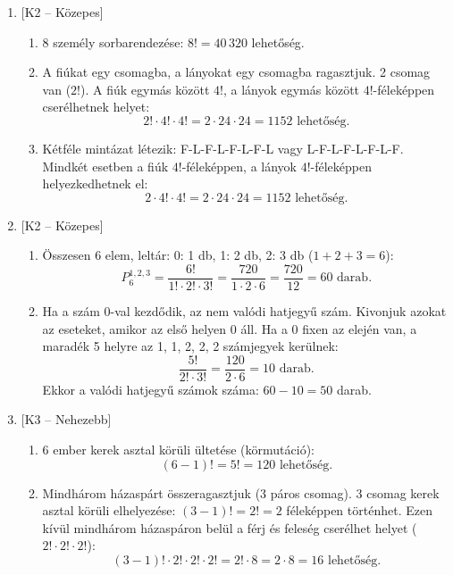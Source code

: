 \documentclass[12pt,a4paper]{article}
\begin{document}
\begin{enumerate}[label=\arabic*., leftmargin=*]
    \item \textsf{\small [K2 – Közepes]}
    \begin{enumerate}[label=\alph*)]
        \item 8 személy sorbarendezése: $8! = 40\,320$ lehetőség.
        \item A fiúkat egy csomagba, a lányokat egy csomagba ragasztjuk. 2 csomag van ($2!$). A fiúk egymás között $4!$, a lányok egymás között $4!$-féleképpen cserélhetnek helyet:
        \[
        2! \cdot 4! \cdot 4! = 2 \cdot 24 \cdot 24 = 1152 \text{ lehetőség.}
        \]
        \item Kétféle mintázat létezik: F-L-F-L-F-L-F-L vagy L-F-L-F-L-F-L-F. Mindkét esetben a fiúk $4!$-féleképpen, a lányok $4!$-féleképpen helyezkedhetnek el:
        \[
        2 \cdot 4! \cdot 4! = 2 \cdot 24 \cdot 24 = 1152 \text{ lehetőség.}
        \]
    \end{enumerate}

    \vspace{0.3cm}

    \item \textsf{\small [K2 – Közepes]}
    \begin{enumerate}[label=\alph*)]
        \item Összesen 6 elem, leltár: 0: 1 db, 1: 2 db, 2: 3 db ($1+2+3=6$):
        \[
        P_6^{1, 2, 3} = \frac{6!}{1! \cdot 2! \cdot 3!} = \frac{720}{1 \cdot 2 \cdot 6} = \frac{720}{12} = 60 \text{ darab.}
        \]
        \item Ha a szám 0-val kezdődik, az nem valódi hatjegyű szám. Kivonjuk azokat az eseteket, amikor az első helyen 0 áll. Ha a 0 fixen az elején van, a maradék 5 helyre az 1, 1, 2, 2, 2 számjegyek kerülnek:
        \[
        \frac{5!}{2! \cdot 3!} = \frac{120}{2 \cdot 6} = 10 \text{ darab.}
        \]
        Ekkor a valódi hatjegyű számok száma: $60 - 10 = 50$ darab.
    \end{enumerate}

    \vspace{0.3cm}

    \item \textsf{\small [K3 – Nehezebb]}
    \begin{enumerate}[label=\alph*)]
        \item 6 ember kerek asztal körüli ültetése (körmutáció):
        \[
        (6 - 1)! = 5! = 120 \text{ lehetőség.}
        \]
        \item Mindhárom házaspárt összeragasztjuk (3 páros csomag). 3 csomag kerek asztal körüli elhelyezése: $(3-1)! = 2! = 2$ féleképpen történhet. Ezen kívül mindhárom házaspáron belül a férj és feleség cserélhet helyet ($2! \cdot 2! \cdot 2!$):
        \[
        (3-1)! \cdot 2! \cdot 2! \cdot 2! = 2! \cdot 8 = 2 \cdot 8 = 16 \text{ lehetőség.}
        \]
    \end{enumerate}


\end{enumerate}
\end{document}
